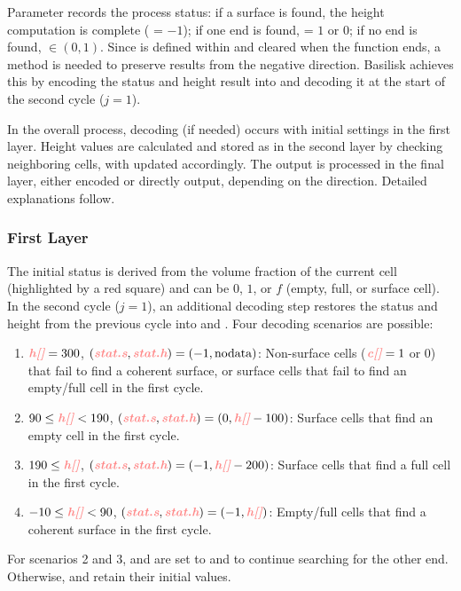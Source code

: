 Parameter  records the process status: if a surface is found, the height computation is complete ( = $-1$); if one end is found,  = $1$ or $0$; if no end is found,  $\in (0,1)$. Since  is defined within  and cleared when the function ends, a method is needed to preserve results from the negative direction. Basilisk achieves this by encoding the status and height result  into  and decoding it at the start of the second cycle ($j=1$).

In the overall process, decoding (if needed) occurs with initial settings in the first layer. Height values are calculated and stored as  in the second layer by checking neighboring cells, with  updated accordingly. The output  is processed in the final layer, either encoded or directly output, depending on the direction. Detailed explanations follow.

\subsubsection{First Layer}
The initial status  is derived from the volume fraction of the current cell (highlighted by a red square) and can be $0$, $1$, or $f$ (empty, full, or surface cell). In the second cycle ($j=1$), an additional decoding step restores the status and height from the previous cycle into  and . Four decoding scenarios are possible:
\begin{enumerate}
    \item $\para{h[]}=300$, $(\para{stat.s},\para{stat.h})=(-1,\text{nodata})$: Non-surface cells ($\para{c[]}=1$ or $0$) that fail to find a coherent surface, or surface cells that fail to find an empty/full cell in the first cycle.
    \item $90\leq\para{h[]}<190$, $(\para{stat.s},\para{stat.h})=(0,\para{h[]}-100)$: Surface cells that find an empty cell in the first cycle.
    \item $190\leq\para{h[]}$, $(\para{stat.s},\para{stat.h})=(-1,\para{h[]}-200)$: Surface cells that find a full cell in the first cycle.
    \item $-10\leq\para{h[]}<90$, $(\para{stat.s},\para{stat.h})=(-1,\para{h[]})$: Empty/full cells that find a coherent surface in the first cycle.
\end{enumerate}
For scenarios 2 and 3,  and  are set to  and  to continue searching for the other end. Otherwise,  and  retain their initial values.

